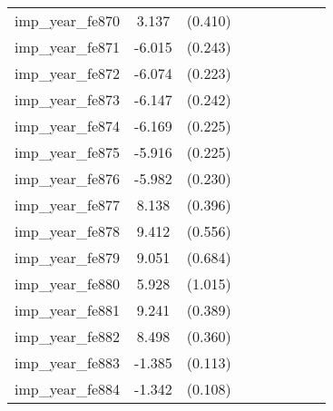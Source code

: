 {\begin{tabular}{l*{4}{cc}}
imp\_year\_fe870&    3.137\sym{***}&  (0.410)&                  &         &                  &         &                  &         \\
imp\_year\_fe871&   -6.015\sym{***}&  (0.243)&                  &         &                  &         &                  &         \\
imp\_year\_fe872&   -6.074\sym{***}&  (0.223)&                  &         &                  &         &                  &         \\
imp\_year\_fe873&   -6.147\sym{***}&  (0.242)&                  &         &                  &         &                  &         \\
imp\_year\_fe874&   -6.169\sym{***}&  (0.225)&                  &         &                  &         &                  &         \\
imp\_year\_fe875&   -5.916\sym{***}&  (0.225)&                  &         &                  &         &                  &         \\
imp\_year\_fe876&   -5.982\sym{***}&  (0.230)&                  &         &                  &         &                  &         \\
imp\_year\_fe877&    8.138\sym{***}&  (0.396)&                  &         &                  &         &                  &         \\
imp\_year\_fe878&    9.412\sym{***}&  (0.556)&                  &         &                  &         &                  &         \\
imp\_year\_fe879&    9.051\sym{***}&  (0.684)&                  &         &                  &         &                  &         \\
imp\_year\_fe880&    5.928\sym{***}&  (1.015)&                  &         &                  &         &                  &         \\
imp\_year\_fe881&    9.241\sym{***}&  (0.389)&                  &         &                  &         &                  &         \\
imp\_year\_fe882&    8.498\sym{***}&  (0.360)&                  &         &                  &         &                  &         \\
imp\_year\_fe883&   -1.385\sym{***}&  (0.113)&                  &         &                  &         &                  &         \\
imp\_year\_fe884&   -1.342\sym{***}&  (0.108)&                  &         &                  &         &                  &         \\

\end{tabular}}

